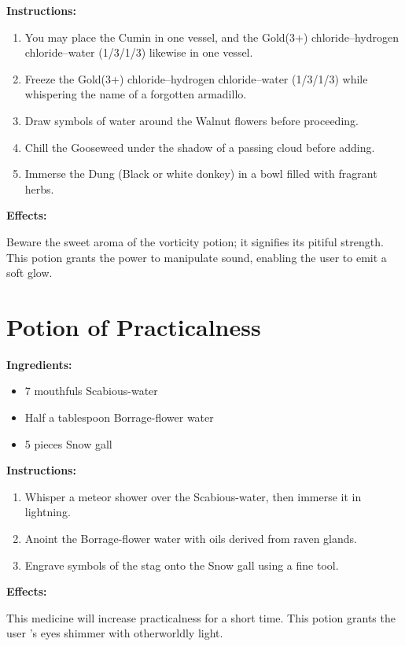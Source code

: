 \documentclass{article}
\begin{document}
\textbf{Instructions:}

\begin{enumerate}
  \item You may place the Cumin in one vessel, and the Gold(3+) chloride--hydrogen chloride--water (1/3/1/3) likewise in one vessel.
  \item Freeze the Gold(3+) chloride--hydrogen chloride--water (1/3/1/3) while whispering the name of a forgotten armadillo.
  \item Draw symbols of water around the Walnut flowers before proceeding.
  \item Chill the Gooseweed under the shadow of a passing cloud before adding.
  \item Immerse the Dung (Black or white donkey) in a bowl filled with fragrant herbs.
\end{enumerate}

\textbf{Effects:}

Beware the sweet aroma of the vorticity potion; it signifies its pitiful strength. This potion grants the power to manipulate sound, enabling the user to emit a soft glow.

\newpage
\section*{Potion of Practicalness}

\textbf{Ingredients:}

\begin{itemize}
  \item 7 mouthfuls Scabious-water
  \item Half a tablespoon Borrage-flower water
  \item 5 pieces Snow gall
\end{itemize}

\textbf{Instructions:}

\begin{enumerate}
  \item Whisper a meteor shower over the Scabious-water, then immerse it in lightning.
  \item Anoint the Borrage-flower water with oils derived from raven glands.
  \item Engrave symbols of the stag onto the Snow gall using a fine tool.
\end{enumerate}

\textbf{Effects:}

This medicine will increase practicalness for a short time. This potion grants the user 's eyes shimmer with otherworldly light.
\end{document}
